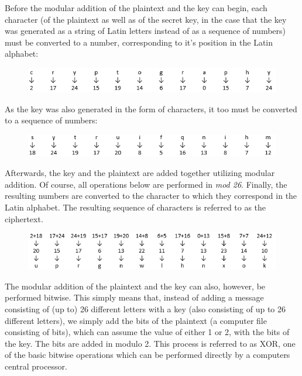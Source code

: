\documentclass[12pt]{report}
\begin{document}
Before the modular addition of the plaintext and the key can begin, each character (of the plaintext as well as of the secret key, in the case that the key was generated as a string of Latin letters instead of as a sequence of numbers) must be converted to a number, corresponding to it's position in the Latin alphabet:

\begin{figure}[H]
\centering
\includegraphics[scale=1]{Table1.PNG}		
\end{figure}


As the key was also generated in the form of characters, it too must be converted to a sequence of numbers:

\begin{figure}[H]
\centering
\includegraphics[scale=1]{Table2.PNG}
\end{figure}

Afterwards, the key and the plaintext are added together utilizing modular addition. Of course, all operations below are performed in \textit{mod 26}. Finally, the resulting numbers are converted to the character to which they correspond in the Latin alphabet. The resulting sequence of characters is referred to as the ciphertext.

\begin{figure}[H]
\centering
\includegraphics[scale=1]{Table3.PNG}
\end{figure}

The modular addition of the plaintext and the key can also, however, be performed bitwise. This simply means that, instead of adding a message consisting of (up to) 26 different letters with a key (also consisting of up to 26 different letters), we simply add the bits of the plaintext (a computer file consisting of bits), which can assume the value of either 1 or 2, with the bits of the key. The bits are added in modulo 2. This process is referred to as XOR, one of the basic bitwise operations which can be performed directly by a computers central processor.
\end{document}
